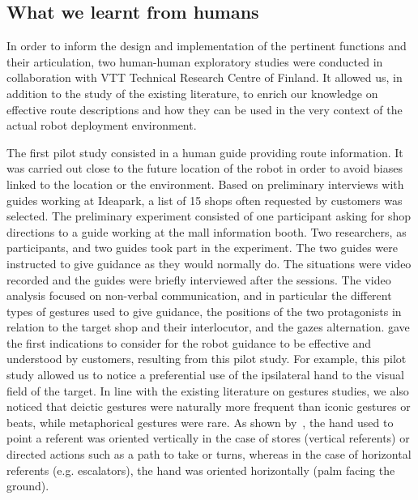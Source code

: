 \documentclass[a4paper,11pt,twoside]{StyleThese}
\begin{document}
\subsection{What we learnt from humans}\label{sec:methodology}
In order to inform the design and implementation of the pertinent functions and their articulation, two human-human exploratory studies were conducted in collaboration with VTT Technical Research Centre of Finland. It allowed us, in addition to the study of the existing literature, to enrich our knowledge on effective route descriptions and how they can be used in the very context of the actual robot deployment environment. 

The first pilot study consisted in a human guide providing route information. It was carried out close to the future location of the robot in order to avoid biases linked to the location or the environment. Based on preliminary interviews with guides working at Ideapark, a list of 15 shops often requested by customers was selected. The preliminary experiment consisted of one participant asking for shop directions to a guide working at the mall information booth. Two researchers, as participants, and two guides took part in the experiment. The two guides were instructed to give guidance as they would normally do. The situations were video recorded and the guides were briefly interviewed after the sessions. The video analysis focused on non-verbal communication, and in particular the different types of gestures used to give guidance, the positions of the two protagonists in relation to the target shop and their interlocutor, and the gazes alternation. \cite{belhassein_2017_human} gave the first indications to consider for the robot guidance to be effective and understood by customers, resulting from this pilot study. For example, this pilot study allowed us to notice a preferential use of the ipsilateral hand to the visual field of the target. In line with the existing literature on gestures studies, we also noticed that deictic gestures were naturally more frequent than iconic gestures or beats, while metaphorical gestures were rare. As shown by~\cite{allen_2003}, the hand used to point a referent was oriented vertically in the case of stores (vertical referents) or directed actions such as a path to take or turns, whereas in the case of horizontal referents (e.g. escalators), the hand was oriented horizontally (palm facing the ground).
\end{document}
